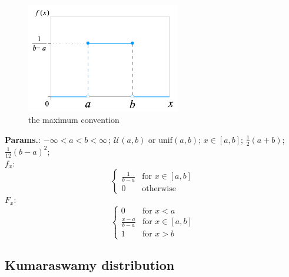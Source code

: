     \begin{figure}[H]
        \centering
        \includegraphics[width=0.6\textwidth]{images/Uniform Distribution PDF SVG.png}
        \caption{the maximum convention}
    \end{figure}




    {\color{darkblue} \textbf{Params.}:} {$-\infty < a < b < \infty \,$}; {$\mathcal{U}(a, b)$ or $\mathrm{unif}(a,b)$}; {$x \in [a,b]$}; {$\tfrac{1}{2}(a+b)$}; {$\tfrac{1}{12}(b-a)^2$};\hspace{0.5cm}\\{\color{darkblue} \textbf{$f_x$}:} {$$\begin{cases}
                  \frac{1}{b - a} & \text{for } x \in [a,b]  \\
                  0               & \text{otherwise}
                \end{cases}$$}{\color{darkblue} \textbf{$F_x$}:} {$$\begin{cases}
                  0               & \text{for } x < a \\
                  \frac{x-a}{b-a} & \text{for } x \in [a,b] \\
                  1               & \text{for } x > b
                \end{cases}$$}



    
        
\subsection{Kumaraswamy distribution}


